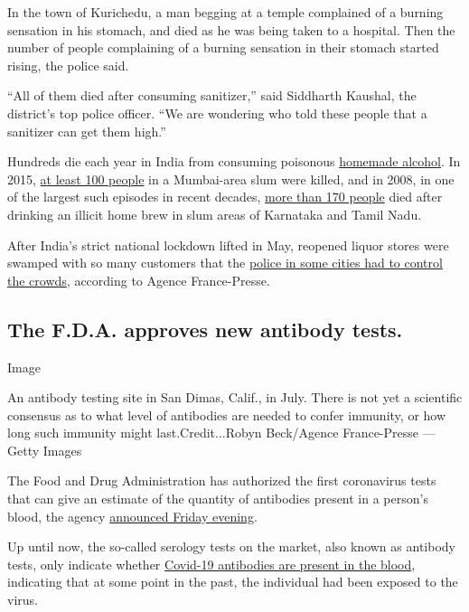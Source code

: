 In the town of Kurichedu, a man begging at a temple complained of a
burning sensation in his stomach, and died as he was being taken to a
hospital. Then the number of people complaining of a burning sensation
in their stomach started rising, the police said.

``All of them died after consuming sanitizer,'' said Siddharth Kaushal,
the district's top police officer. ``We are wondering who told these
people that a sanitizer can get them high.''

Hundreds die each year in India from consuming poisonous
\href{https://www.nytimes3xbfgragh.onion/2019/02/11/world/asia/india-toxic-alcohol.html}{homemade
alcohol}. In 2015,
\href{https://www.bbc.com/news/world-asia-india-33224514}{at least 100
people} in a Mumbai-area slum were killed, and in 2008, in one of the
largest such episodes in recent decades,
\href{https://timesofindia.indiatimes.com/city/chennai/TN-hooch-tragedy-21-cops-suspended/articleshow/3159848.cms?referral=PM}{more
than 170 people} died after drinking an illicit home brew in slum areas
of Karnataka and Tamil Nadu.

After India's strict national lockdown lifted in May, reopened liquor
stores were swamped with so many customers that the
\href{https://news.yahoo.com/chaos-outside-liquor-stores-india-eases-virus-lockdown-112326078.html}{police
in some cities had to control the crowds}, according to Agence
France-Presse.

\hypertarget{the-fda-approves-new-antibody-tests}{%
\subsection{The F.D.A. approves new antibody
tests.}\label{the-fda-approves-new-antibody-tests}}

Image

An antibody testing site in San Dimas, Calif., in July. There is not yet
a scientific consensus as to what level of antibodies are needed to
confer immunity, or how long such immunity might last.Credit...Robyn
Beck/Agence France-Presse --- Getty Images

The Food and Drug Administration has authorized the first coronavirus
tests that can give an estimate of the quantity of antibodies present in
a person's blood, the agency
\href{https://www.fda.gov/news-events/press-announcements/coronavirus-covid-19-update-fda-authorizes-first-tests-estimate-patients-antibodies-past-sars-cov-2}{announced
Friday evening}.

Up until now, the so-called serology tests on the market, also known as
antibody tests, only indicate whether
\href{https://www.nytimes3xbfgragh.onion/2020/07/26/health/coronvirus-antibody-tests.html}{Covid-19
antibodies are present in the blood}, indicating that at some point in
the past, the individual had been exposed to the virus.

